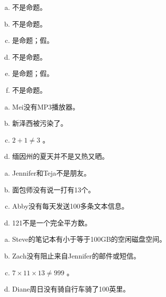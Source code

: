 {{        \begin{practices}
            \begin{enumerate}[a)]
                \item 不是命题。
                \item 不是命题。
                \item 是命题；假。
                \item 不是命题。
                \item 是命题；假。
                \item 不是命题。
            \end{enumerate}
        \end{practices}

        \begin{practices}
            \begin{enumerate}[a)]
                \item Mei没有MP3播放器。
                \item 新泽西被污染了。
                \item $2 + 1 \neq 3$ 。
                \item 缅因州的夏天并不是又热又晒。
            \end{enumerate}
        \end{practices}

        \begin{practices}
            \begin{enumerate}[a)]
                \item Jennifer和Teja不是朋友。
                \item 面包师没有说一打有13个。
                \item Abby没有每天发送100多条文本信息。
                \item 121不是一个完全平方数。
            \end{enumerate}
        \end{practices}

        \begin{practices}
            \begin{enumerate}[a)]
                \item Steve的笔记本有小于等于100GB的空闲磁盘空间。
                \item Zach没有阻止来自Jennifer的邮件或短信。
                \item $7 \times 11 \times 13 \neq 999$ 。
                \item Diane周日没有骑自行车骑了100英里。
            \end{enumerate}
        \end{practices}

}}
